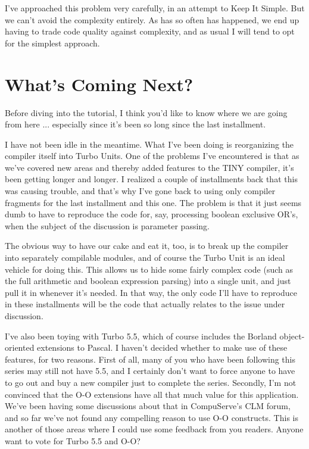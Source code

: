 \documentclass[float=false, crop=false]{standalone}
\begin{document}
I've approached this problem very carefully, in an attempt to Keep It Simple.
But we can't avoid the complexity entirely. As has so often has happened, we end
up having to trade code quality against complexity, and as usual I will tend to
opt for the simplest approach.


\section{What's Coming Next?}

Before diving into the tutorial, I think you'd like to know where we are going
from here ... especially since it's been so long since the last installment.

I have not been idle in the meantime. What I've been doing is reorganizing the
compiler itself into Turbo Units. One of the problems I've encountered is that
as we've covered new areas and thereby added features to the TINY compiler, it's
been getting longer and longer. I realized a couple of installments back that
this was causing trouble, and that's why I've gone back to using only compiler
fragments for the last installment and this one. The problem is that it just
seems dumb to have to reproduce the code for, say, processing boolean exclusive
OR's, when the subject of the discussion is parameter passing.

The obvious way to have our cake and eat it, too, is to break up the compiler
into separately compilable modules, and of course the Turbo Unit is an ideal
vehicle for doing this. This allows us to hide some fairly complex code (such as
the full arithmetic and boolean expression parsing) into a single unit, and just
pull it in whenever it's needed. In that way, the only code I'll have to
reproduce in these installments will be the code that actually relates to the
issue under discussion.

I've also been toying with Turbo 5.5, which of course includes the Borland
object-oriented extensions to Pascal. I haven't decided whether to make use of
these features, for two reasons. First of all, many of you who have been
following this series may still not have 5.5, and I certainly don't want to
force anyone to have to go out and buy a new compiler just to complete the
series. Secondly, I'm not convinced that the O-O extensions have all that much
value for this application. We've been having some discussions about that in
CompuServe's CLM forum, and so far we've not found any compelling reason to use
O-O constructs. This is another of those areas where I could use some feedback
from you readers. Anyone want to vote for Turbo 5.5 and O-O?
\end{document}
